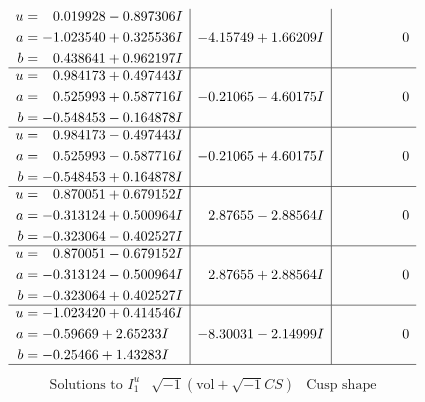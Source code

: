 \documentclass[1p]{elsarticle_modified}
\theoremstyle{definition}
\newcommand{\I}{\sqrt{-1}}
\begin{document}
$$\begin{array}{c|c|c}
\begin{aligned}
u &= \phantom{-}0.019928 - 0.897306 I \\
a &= -1.023540 + 0.325536 I \\
b &= \phantom{-}0.438641 + 0.962197 I\end{aligned}
 & -4.15749 + 1.66209 I & \phantom{-0.000000 } 0 \\ \hline\begin{aligned}
u &= \phantom{-}0.984173 + 0.497443 I \\
a &= \phantom{-}0.525993 + 0.587716 I \\
b &= -0.548453 - 0.164878 I\end{aligned}
 & -0.21065 - 4.60175 I & \phantom{-0.000000 } 0 \\ \hline\begin{aligned}
u &= \phantom{-}0.984173 - 0.497443 I \\
a &= \phantom{-}0.525993 - 0.587716 I \\
b &= -0.548453 + 0.164878 I\end{aligned}
 & -0.21065 + 4.60175 I & \phantom{-0.000000 } 0 \\ \hline\begin{aligned}
u &= \phantom{-}0.870051 + 0.679152 I \\
a &= -0.313124 + 0.500964 I \\
b &= -0.323064 - 0.402527 I\end{aligned}
 & \phantom{-}2.87655 - 2.88564 I & \phantom{-0.000000 } 0 \\ \hline\begin{aligned}
u &= \phantom{-}0.870051 - 0.679152 I \\
a &= -0.313124 - 0.500964 I \\
b &= -0.323064 + 0.402527 I\end{aligned}
 & \phantom{-}2.87655 + 2.88564 I & \phantom{-0.000000 } 0 \\ \hline\begin{aligned}
u &= -1.023420 + 0.414546 I \\
a &= -0.59669 + 2.65233 I \\
b &= -0.25466 + 1.43283 I\end{aligned}
 & -8.30031 - 2.14999 I & \phantom{-0.000000 } 0\\
 \hline 
 \end{array}$$\newpage$$\begin{array}{c|c|c}  
\text{Solutions to }I^u_{1}& \I (\text{vol} + \sqrt{-1}CS) & \text{Cusp shape}\\
 \hline 
\begin{aligned}

\end{aligned}
\end{array}$$
\end{document}
